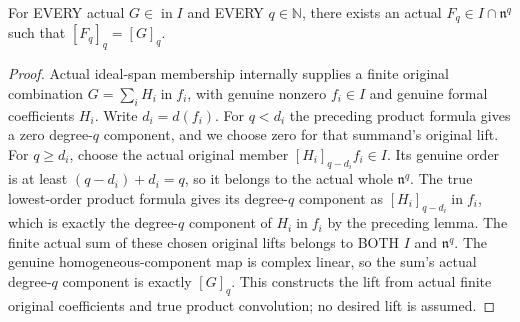 \begin{theorem}
\label{hir:actual-homogeneous-initial-ideal-degree-lift}
For EVERY actual $G\in\operatorname{in}I$ and EVERY $q\in\mathbb N$,
there exists an actual $F_q\in I\cap\mathfrak n^q$ such that
$[F_q]_q=[G]_q$.
\leanok
\end{theorem}
\begin{proof}
Actual ideal-span membership internally supplies a finite original
combination $G=\sum_i H_i\operatorname{in}f_i$, with genuine nonzero
$f_i\in I$ and genuine formal coefficients $H_i$. Write $d_i=d(f_i)$.
For $q<d_i$ the preceding product formula gives a zero degree-$q$
component, and we choose zero for that summand's original lift.
For $q\ge d_i$, choose the actual original member
$[H_i]_{q-d_i}f_i\in I$. Its genuine order is at least
$(q-d_i)+d_i=q$, so it belongs to the actual whole $\mathfrak n^q$.
The true lowest-order product formula gives its degree-$q$ component
as $[H_i]_{q-d_i}\operatorname{in}f_i$, which is exactly the degree-$q$
component of $H_i\operatorname{in}f_i$ by the preceding lemma.
The finite actual sum of these chosen original lifts belongs to BOTH
$I$ and $\mathfrak n^q$. The genuine homogeneous-component map is
complex linear, so the sum's actual degree-$q$ component is exactly
$[G]_q$. This constructs the lift from actual finite original
coefficients and true product convolution; no desired lift is assumed.
\end{proof}

